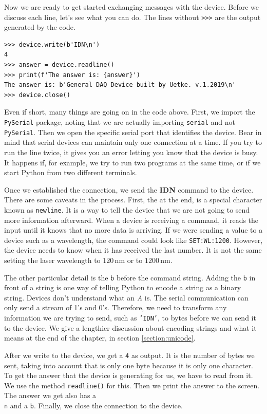 Now we are ready to get started exchanging messages with the device. Before we discuss each line, let's see what you can do. The lines without \texttt{>>>} are the output generated by the code.

\begin{verbatim}
>>> device.write(b'IDN\n')
4
>>> answer = device.readline()
>>> print(f'The answer is: {answer}')
The answer is: b'General DAQ Device built by Uetke. v.1.2019\n'
>>> device.close()
\end{verbatim}

Even if short, many things are going on in the code above. First, we import the \texttt{PySerial} package, noting that we are actually importing \texttt{serial} and not \texttt{PySerial}. Then we open the specific serial port that identifies the device. Bear in mind that serial devices can maintain only one connection at a time. If you try to run the line twice, it gives you an error letting you know that the device is busy. It happens if, for example, we try to run two programs at the same time, or if we start Python from two different terminals.

Once we established the connection, we send the \textbf{{IDN}} command to the device. There are some caveats in the process. First, the \texttt{\n} at the end, is a special character known as \texttt{newline}. It is a way to tell the device that we are
not going to send more information afterward. When a device is receiving a command, it reads the input until it knows that no more data is arriving. If we were sending a value to a device such as a wavelength, the command could look like \texttt{SET:WL:1200}. However, the device needs to know when it has received the last number. It is not the same setting the laser wavelength to $120\,\textrm{nm}$ or to $1200\,\textrm{nm}$.

The other particular detail is the \texttt{b} before the command string. Adding the \texttt{b} in front of a string is one way of telling Python to encode a string as a binary string. Devices don't understand what an \textit{A} is. The serial communication can only send a stream of 1's and 0's. Therefore, we need to transform any information we are trying to send, such as \texttt{'IDN'}, to bytes before we can send it to the device. We give a lengthier discussion about encoding strings and what it means at the end of the chapter, in section \ref{section:unicode}.

After we write to the device, we get a \texttt{4} as output. It is the number of bytes we sent, taking into account that \texttt{\n} is only one byte because it is only one character. To get the answer that the device is generating for us, we have to read from it. We use the method \texttt{readline()} for this. Then we print the answer to the screen. The answer we get also has a \texttt{\\n} and a \texttt{b}. Finally, we close the connection to the device.

